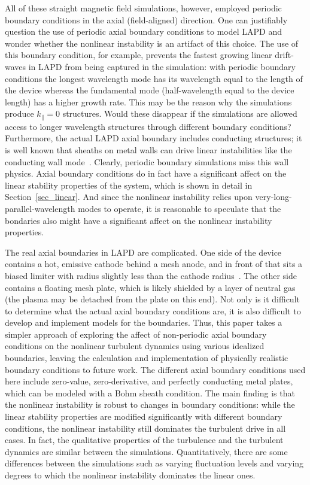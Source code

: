 \documentclass[showpacs,preprintnumbers,amsmath,amssymb,superscriptaddress,aip]{revtex4-1}
\def\para{\parallel}
\begin{document}
All of these straight magnetic field simulations, however, employed periodic boundary conditions in the axial (field-aligned) direction.   
One can justifiably question the use of periodic axial boundary conditions to model LAPD and wonder whether the nonlinear instability is an artifact of this choice.  
The use of this boundary condition, for example, prevents the fastest growing linear drift-waves in LAPD from being captured in the simulation: 
with periodic boundary conditions the longest wavelength mode has its wavelength equal to the length of the device whereas the fundamental mode 
(half-wavelength equal to the device length) has a higher growth rate.  This may be the reason why the simulations produce $k_\para = 0$ structures. Would these disappear if the simulations
are allowed access to longer wavelength structures through different boundary conditions?
Furthermore, the actual LAPD axial boundary includes conducting structures; 
it is well known that sheaths on metal walls can drive linear instabilities like the conducting wall mode~\cite{berk1991}. Clearly, periodic boundary simulations miss this wall physics.
Axial boundary conditions do in fact have a significant
affect on the linear stability properties of the system, which is shown in detail in Section~\ref{sec_linear}. 
And since the nonlinear instability relies upon very-long-parallel-wavelength modes to operate, it is 
reasonable to speculate that the bondaries also might have a significant affect on the nonlinear instability properties.

The real axial boundaries in LAPD are complicated. One side of the device contains a hot, emissive cathode behind a mesh anode, and in front of that sits a biased limiter with radius slightly
less than the cathode radius~\cite{schaffner2012}.
The other side contains a floating mesh plate, which is likely shielded by a layer of neutral gas (the plasma may be detached from the plate on this end). Not only is it difficult to determine what the actual axial boundary conditions are, it is also
difficult to develop and implement models for the boundaries. Thus, this paper takes a simpler approach of exploring the affect of 
non-periodic axial boundary conditions on the nonlinear turbulent dynamics using various
idealized boundaries, leaving the calculation and implementation of physically realistic boundary conditions to future work. 
The different axial boundary conditions used here include zero-value, zero-derivative, and perfectly conducting metal plates, which can be modeled with a Bohm sheath condition. 
The main finding is that the nonlinear instability is robust to changes in boundary conditions:  while the linear stability properties are modified significantly with different boundary conditions,  the 
nonlinear instability still dominates the turbulent drive in all cases. 
In fact, the qualitative properties of the turbulence and the turbulent
dynamics are similar between the simulations. Quantitatively, there are some differences between the simulations such as varying fluctuation levels and varying degrees to which
the nonlinear instability dominates the linear ones.
\end{document}
